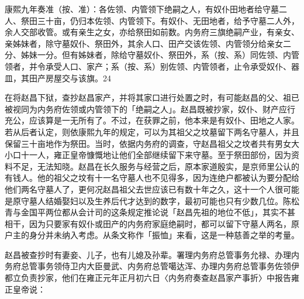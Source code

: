 \vfill
\begin{BookNotes}
\end{BookNotes}

\begin{BookQuote}
康熙九年奏准（按、准）：各佐领、内管领下绝嗣之人，有奴仆田地者给守墓二人、祭田三十亩，仍归本佐领、内管领下。有奴仆、无田地者，给予守墓二人外，余人交部收管。或有亲生之女，亦给祭田如前数。内务府三旗绝嗣产业，有亲女、亲姊妹者，除守墓奴仆、祭田外，其余人口、田产交该佐领、内管领分给亲女二分、姊妹一分。但有姊妹者，除给守墓奴仆、祭田外，系（按、系）同佐领、内管领者，并令承受人口、家产；系（按、系）别佐领、内管领者，止令承受奴仆、器皿，其田产房屋交与该旗。24
\end{BookQuote}

在将赵昌下狱，查抄赵昌家产，并将其家口进行处置之时，有可能赵昌的父、祖已被视同为内务府佐领或内管领下的「绝嗣之人」。赵昌既被抄家，奴仆、财产应行充公，应该算是一无所有了。不过，在获罪之前，他本来是有奴仆、田地之人家。若从后者认定，则依康熙九年的规定，可以为其祖父之坟墓留下两名守墓人，并且保留三十亩地作为祭田。当时，依据内务府的调查，守赵昌祖父之坟者共有男女大小口十一人，雍正皇帝慷慨地让他们全部继续留下来守墓。至于祭田部份，因为资料不足，无法知晓。赵昌在长久服务与经营之后，原本家道殷实，是京师里公认的有钱人。他的祖父之坟有十一名守墓人也不见得多，因为连绝户都被认为要分配给他们两名守墓人了，更何况赵昌祖父去世应该已有数十年之久，这十一个人很可能是原守墓人结婚娶妇以及生养后代才达到的数字，最初可能也只有少数几位。陈松青与金国平两位都从会计司的这条规定推论说「赵昌先祖的地位不低」，其实不甚相干，因为只要家有奴仆或田产的内务府家庭绝嗣时，都可以留下守墓人两名，原户主的身分并未纳入考虑。从条文称作「振恤」来看，这是一种慈善之举的考量。

赵昌被查抄时有妻妾、儿子，也有儿媳及孙辈。署理内务府总管事务允禄、办理内务府总管事务领侍卫内大臣曼武、内务府总管噶达浑、办理内务府总管事务佐领伊都立负责抄家，他们在雍正元年正月初六日〈内务府奏查赵昌家产事折〉中报告雍正皇帝说：

\vfill
\begin{BookNotes}
\end{BookNotes}

